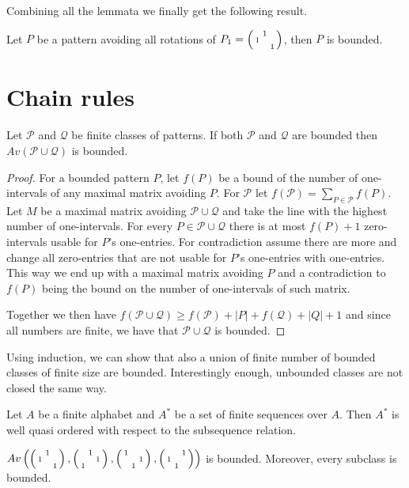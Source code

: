 Combining all the lemmata we finally get the following result.

\begin{thm}
Let $P$ be a pattern avoiding all rotations of $P_1=\left(\begin{smallmatrix} &1& \\1& & \\ & &1\end{smallmatrix}\right)$, then $P$ is bounded.
\end{thm}

\section{Chain rules}
\begin{thm}
Let $\mathcal{P}$ and $\mathcal{Q}$ be finite classes of patterns. If both $\mathcal{P}$ and $\mathcal{Q}$ are bounded then $Av(\mathcal{P}\cup\mathcal{Q})$ is bounded.
\end{thm}
\begin{proof}
For a bounded pattern $P$, let $f(P)$ be a bound of the number of one-intervals of any maximal matrix avoiding $P$. For $\mathcal{P}$ let $f(\mathcal{P})=\sum_{P\in\mathcal{P}}f(P)$. Let $M$ be a maximal matrix avoiding $\mathcal{P}\cup\mathcal{Q}$ and take the line with the highest number of one-intervals. For every $P\in\mathcal{P}\cup\mathcal{Q}$ there is at most $f(P)+1$ zero-intervals usable for $P$'s one-entries. For contradiction assume there are more and change all zero-entries that are not usable for $P$'s one-entries with one-entries. This way we end up with a maximal matrix avoiding $P$ and a contradiction to $f(P)$ being the bound on the number of one-intervals of such matrix.

Together we then have $f(\mathcal{P}\cup\mathcal{Q})\geq f(\mathcal{P})+|P|+f(\mathcal{Q})+|Q|+1$ and since all numbers are finite, we have that $\mathcal{P}\cup\mathcal{Q}$ is bounded.
\end{proof}
Using induction, we can show that also a union of finite number of bounded classes of finite size are bounded. Interestingly enough, unbounded classes are not closed the same way.

\begin{fct}
Let $A$ be a finite alphabet and $A^*$ be a set of finite sequences over $A$. Then $A^*$ is well quasi ordered with respect to the subsequence relation.
\end{fct}
\begin{thm}
$Av\left(\left(\begin{smallmatrix} &1& \\1& & \\ & &1\end{smallmatrix}\right),\left(\begin{smallmatrix} &1& \\ & &1\\1& & \end{smallmatrix}\right),\left(\begin{smallmatrix}1& & \\ & &1\\ &1& \end{smallmatrix}\right),\left(\begin{smallmatrix} & &1\\1& & \\ &1& \end{smallmatrix}\right)\right)$ is bounded. Moreover, every subclass is bounded.
\end{thm}

